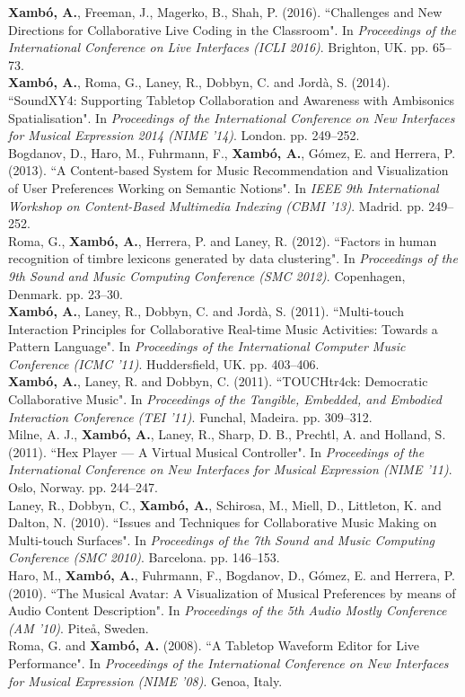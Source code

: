 \documentclass[10pt, a4paper]{article}
\newcommand{\years}[1]{\marginnote{\scriptsize #1}}
\begin{document}
{{\years{2016a}\textbf{Xambó, A.}, Freeman, J., Magerko, B., Shah, P. (2016). “Challenges and New Directions for Collaborative Live Coding in the Classroom". In \emph{Proceedings of the International Conference on Live Interfaces (ICLI 2016)}. Brighton, UK. pp. 65--73.\\
\years{2014}\textbf{Xambó, A.}, Roma, G., Laney, R., Dobbyn, C. and Jordà, S. (2014). “SoundXY4: Supporting Tabletop Collaboration and Awareness with Ambisonics Spatialisation". In \emph{Proceedings of the International Conference on New Interfaces for Musical Expression 2014 (NIME '14)}. London. pp. 249--252.\\
\years{2013}Bogdanov, D., Haro, M., Fuhrmann, F., \textbf{Xambó, A.}, Gómez, E. and Herrera, P. (2013). “A Content-based System for Music Recommendation and Visualization of User Preferences Working on Semantic Notions". In \emph{IEEE 9th International Workshop on Content-Based Multimedia Indexing (CBMI '13)}. Madrid. pp. 249--252.\\
\years{2012}Roma, G., \textbf{Xambó, A.}, Herrera, P. and Laney, R. (2012). “Factors in human recognition of timbre lexicons generated by data clustering". In \emph{Proceedings of the 9th Sound and Music Computing Conference (SMC 2012)}. Copenhagen, Denmark. pp. 23--30.\\
\years{2011c}\textbf{Xambó, A.}, Laney, R., Dobbyn, C. and Jordà, S. (2011). “Multi-touch Interaction Principles for Collaborative Real-time Music Activities: Towards a Pattern Language". In \emph{Proceedings of the International Computer Music Conference (ICMC '11)}. Huddersfield, UK. pp. 403--406.\\
\years{2011b}\textbf{Xambó, A.}, Laney, R. and Dobbyn, C. (2011). “TOUCHtr4ck: Democratic Collaborative Music". In \emph{Proceedings of the Tangible, Embedded, and Embodied Interaction Conference (TEI '11)}. Funchal, Madeira. pp. 309--312.\\
\years{2011a}Milne, A. J., \textbf{Xambó, A.}, Laney, R., Sharp, D. B., Prechtl, A. and Holland, S. (2011). “Hex Player — A Virtual Musical Controller". In \emph{Proceedings of the International Conference on New Interfaces for Musical Expression (NIME '11)}. Oslo, Norway. pp. 244--247.\\
\years{2010b}Laney, R., Dobbyn, C., \textbf{Xambó, A.}, Schirosa, M., Miell, D., Littleton, K. and Dalton, N. (2010). “Issues and Techniques for Collaborative Music Making on Multi-touch Surfaces". In \emph{Proceedings of the 7th Sound and Music Computing Conference (SMC 2010)}. Barcelona. pp. 146–153.\\
\years{2010a}Haro, M., \textbf{Xambó, A.}, Fuhrmann, F., Bogdanov, D., Gómez, E. and Herrera, P. (2010). “The Musical Avatar: A Visualization of Musical Preferences by means of Audio Content Description". In \emph{Proceedings of the 5th Audio Mostly Conference (AM '10)}. Piteå, Sweden.\\
\years{2008}Roma, G. and \textbf{Xambó, A.} (2008). “A Tabletop Waveform Editor for Live Performance". In \emph{Proceedings of the International Conference on New Interfaces for Musical Expression (NIME '08)}. Genoa, Italy.

}}
\end{document}
